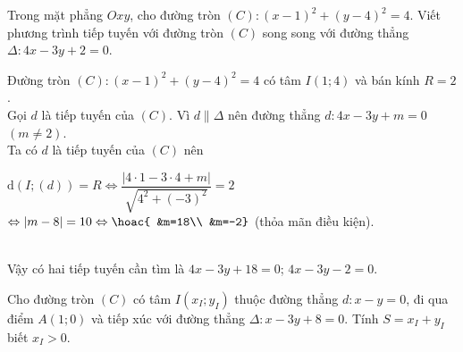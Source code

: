\begin{bt}%
	Trong mặt phẳng $Oxy$, cho đường tròn $(C)\colon \left(x-1\right)^2+\left(y-4\right)^2=4$. Viết phương trình tiếp tuyến với đường tròn $(C)$ song song với đường thẳng $\Delta\colon 4x-3y+2=0$.
	\loigiai
	{
		Đường tròn $(C)\colon \left(x-1\right)^2+\left(y-4\right)^2=4$ có tâm $I(1;4)$ và bán kính $R=2$.\\
		Gọi $d$ là tiếp tuyến của $(C)$. Vì $d\parallel\Delta$ nên đường thẳng $d\colon 4x-3y+m=0$ $(m\neq2)$.\\
		Ta có $d$ là tiếp tuyến của $(C)$ nên \\
		\centerline{$\mathrm{d}(I;(d))=R\Leftrightarrow\dfrac{|4\cdot1-3\cdot4+m|}{\sqrt{4^2+\left(-3\right)^2}}=2$ \\
			$\Leftrightarrow |m-8|=10\Leftrightarrow \hoac{
				&m=18\\
				&m=-2}$ (thỏa mãn điều kiện).}\\
		Vậy có hai tiếp tuyến cần tìm là $4x-3y+18=0$; $4x-3y-2=0$.
	}
\end{bt}
\begin{bt}%
	Cho đường tròn $(C)$ có tâm $I(x_I;y_I)$ thuộc đường thẳng $ d\colon x-y=0$, đi qua điểm $A(1;0)$ và tiếp xúc với đường thẳng $\Delta \colon x-3y+8=0$. Tính $S=x_I+y_I$ biết $x_I>0$.
\end{bt}
